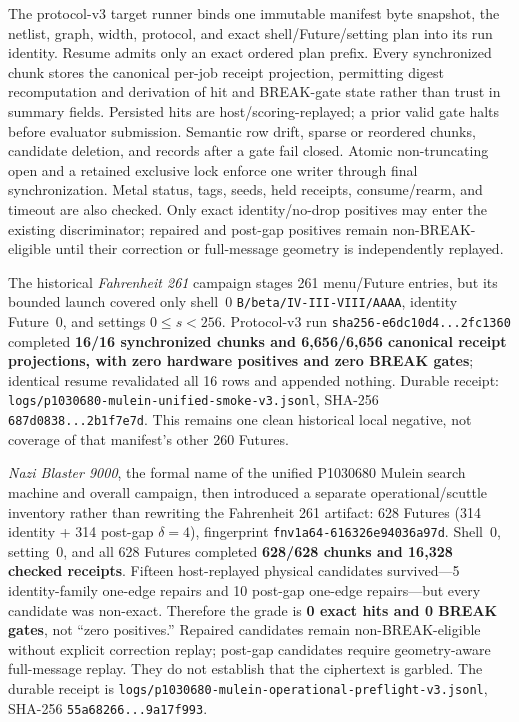 \documentclass[11pt,a4paper]{article}
\begin{document}
The protocol-v3 target runner binds one immutable manifest byte snapshot, the
netlist, graph, width, protocol, and exact shell/Future/setting plan into its
run identity. Resume admits only an exact ordered plan prefix. Every synchronized
chunk stores the canonical per-job receipt projection, permitting digest
recomputation and derivation of hit and BREAK-gate state rather than trust in
summary fields. Persisted hits are host/scoring-replayed; a prior valid gate
halts before evaluator submission. Semantic row drift, sparse or reordered
chunks, candidate deletion, and records after a gate fail closed. Atomic
non-truncating open and a retained exclusive lock enforce one writer through
final synchronization. Metal status, tags, seeds, held receipts, consume/rearm,
and timeout are also checked. Only exact identity/no-drop positives may enter
the existing discriminator; repaired and post-gap positives remain
non-BREAK-eligible until their correction or full-message geometry is
independently replayed.

The historical \emph{Fahrenheit 261} campaign stages 261 menu/Future
entries, but its bounded launch covered only shell~0
\texttt{B/beta/IV-III-VIII/AAAA}, identity Future~0, and settings
$0\le s<256$. Protocol-v3 run \texttt{sha256-e6dc10d4...2fc1360}
completed \textbf{16/16 synchronized chunks and 6{,}656/6{,}656 canonical
receipt projections, with zero hardware positives and zero BREAK gates};
identical resume revalidated all 16 rows and appended nothing. Durable receipt:
\texttt{logs/p1030680-mulein-unified-smoke-v3.jsonl}, SHA-256
\texttt{687d0838...2b1f7e7d}. This remains one clean historical local negative,
not coverage of that manifest's other 260 Futures.

\emph{Nazi Blaster 9000}, the formal name of the unified P1030680 Mulein
search machine and overall campaign, then introduced a separate
operational/scuttle inventory rather than rewriting the Fahrenheit 261 artifact: 628 Futures (314 identity + 314 post-gap $\delta=4$),
fingerprint \texttt{fnv1a64-616326e94036a97d}. Shell~0, setting~0, and all
628 Futures completed \textbf{628/628 chunks and 16{,}328 checked receipts}.
Fifteen host-replayed physical candidates survived---5 identity-family
one-edge repairs and 10 post-gap one-edge repairs---but every candidate was
non-exact. Therefore the grade is \textbf{0 exact hits and 0 BREAK gates}, not
``zero positives.'' Repaired candidates remain non-BREAK-eligible without
explicit correction replay; post-gap candidates require geometry-aware
full-message replay. They do not establish that the ciphertext is garbled.
The durable receipt is
\texttt{logs/p1030680-mulein-operational-preflight-v3.jsonl}, SHA-256
\texttt{55a68266...9a17f993}.
\end{document}
